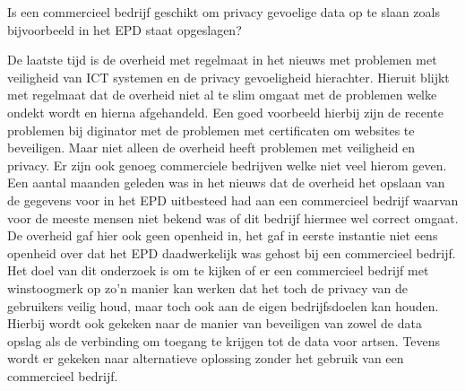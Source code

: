 Is een commercieel bedrijf geschikt om privacy gevoelige data op te slaan zoals bijvoorbeeld in het EPD staat opgeslagen? 

De laatste tijd is de overheid met regelmaat in het nieuws met problemen met veiligheid van ICT systemen en de privacy gevoeligheid hierachter. Hieruit blijkt met regelmaat dat de overheid niet al te slim omgaat met de problemen welke ondekt wordt en hierna afgehandeld. Een goed voorbeeld hierbij zijn de recente problemen bij diginator met de problemen met certificaten om websites te beveiligen. Maar niet alleen de overheid heeft problemen met veiligheid en privacy. Er zijn ook genoeg commerciele bedrijven welke niet veel hierom geven. Een aantal maanden geleden was in het nieuws dat de overheid het opslaan van de gegevens voor in het EPD uitbesteed had aan een commercieel bedrijf waarvan voor de meeste mensen niet bekend was of dit bedrijf hiermee wel correct omgaat. De overheid gaf hier ook geen openheid in, het gaf in eerste instantie niet eens openheid over dat het EPD daadwerkelijk was gehost bij een commercieel bedrijf. 
Het doel van dit onderzoek is om te kijken of er een commercieel bedrijf met winstoogmerk op zo'n manier kan werken dat het toch de privacy van de gebruikers veilig houd, maar toch ook aan de eigen bedrijfsdoelen kan houden. Hierbij wordt ook gekeken naar de manier van beveiligen van zowel de data opslag als de verbinding om toegang te krijgen tot de data voor artsen. Tevens wordt er gekeken naar alternatieve oplossing zonder het gebruik van een commercieel bedrijf.
